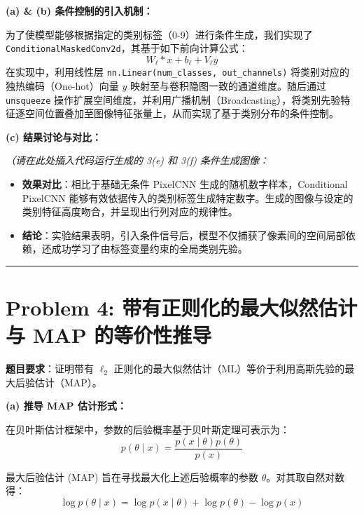 \documentclass[a4paper, 11pt]{ctexart}
\begin{document}
\textbf{(a) \& (b) 条件控制的引入机制：}

为了使模型能够根据指定的类别标签（0-9）进行条件生成，我们实现了 \texttt{ConditionalMaskedConv2d}，其基于如下前向计算公式：
\begin{equation}
W_\ell \ast x + b_\ell + V_\ell y
\end{equation}
在实现中，利用线性层 \texttt{nn.Linear(num\_classes, out\_channels)} 将类别对应的独热编码（One-hot）向量 $y$ 映射至与卷积隐图一致的通道维度。随后通过 \texttt{unsqueeze} 操作扩展空间维度，并利用广播机制（Broadcasting），将类别先验特征逐空间位置叠加至图像特征张量上，从而实现了基于类别分布的条件控制。

\textbf{(c) 结果讨论与对比：}

\textit{（请在此处插入代码运行生成的 3(e) 和 3(f) 条件生成图像：}
\begin{center}
\end{center}

\begin{itemize}
    \item \textbf{效果对比}：相比于基础无条件 PixelCNN 生成的随机数字样本，Conditional PixelCNN 能够有效依据传入的类别标签生成特定数字。生成的图像与设定的类别特征高度吻合，并呈现出行列对应的规律性。
    \item \textbf{结论}：实验结果表明，引入条件信号后，模型不仅捕获了像素间的空间局部依赖，还成功学习了由标签变量约束的全局类别先验。
\end{itemize}

\vspace{1em}
\hrule
\vspace{1em}

\section*{Problem 4: 带有正则化的最大似然估计与 MAP 的等价性推导}

\textbf{题目要求}：证明带有 $\ell_2$ 正则化的最大似然估计（ML）等价于利用高斯先验的最大后验估计（MAP）。

\textbf{(a) 推导 MAP 估计形式：}

在贝叶斯估计框架中，参数的后验概率基于贝叶斯定理可表示为：
\begin{equation}
p(\theta \mid x) = \frac{p(x \mid \theta) p(\theta)}{p(x)}
\end{equation}

最大后验估计 (MAP) 旨在寻找最大化上述后验概率的参数 $\theta$。对其取自然对数得：
\begin{equation}
\log p(\theta \mid x) = \log p(x \mid \theta) + \log p(\theta) - \log p(x)
\end{equation}
\end{document}
